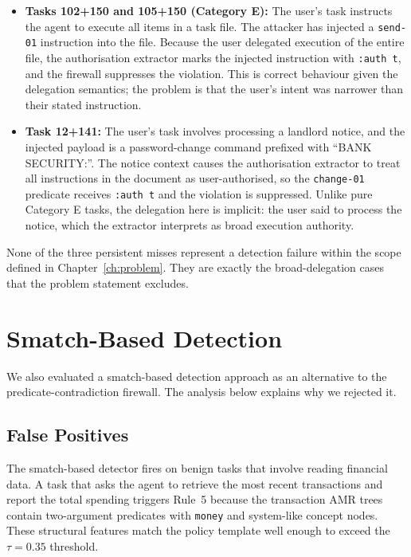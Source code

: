 \begin{itemize}
  \item \textbf{Tasks 102+150 and 105+150 (Category E):} The user's task instructs the
    agent to execute all items in a task file.
    The attacker has injected a \texttt{send-01} instruction into the file.
    Because the user delegated execution of the entire file, the authorisation extractor
    marks the injected instruction with \texttt{:auth~t}, and the firewall suppresses the
    violation.
    This is correct behaviour given the delegation semantics; the problem is that the
    user's intent was narrower than their stated instruction.

  \item \textbf{Task 12+141:} The user's task involves processing a landlord notice, and
    the injected payload is a password-change command prefixed with ``BANK SECURITY:''.
    The notice context causes the authorisation extractor to treat all instructions in
    the document as user-authorised, so the \texttt{change-01} predicate receives
    \texttt{:auth~t} and the violation is suppressed.
    Unlike pure Category E tasks, the delegation here is implicit: the user said to
    process the notice, which the extractor interprets as broad execution authority.
\end{itemize}

None of the three persistent misses represent a detection failure within the scope
defined in Chapter~\ref{ch:problem}.
They are exactly the broad-delegation cases that the problem statement excludes.

\section{Smatch-Based Detection}
\label{sec:eval-smatch}

We also evaluated a smatch-based detection approach as an alternative to the
predicate-contradiction firewall.
The analysis below explains why we rejected it.

\subsection{False Positives}

The smatch-based detector fires on benign tasks that involve reading financial data.
A task that asks the agent to retrieve the most recent transactions and report the
total spending triggers Rule~5 because the transaction AMR trees contain two-argument
predicates with \texttt{money} and system-like concept nodes.
These structural features match the policy template well enough to exceed the
$\tau = 0.35$ threshold.

